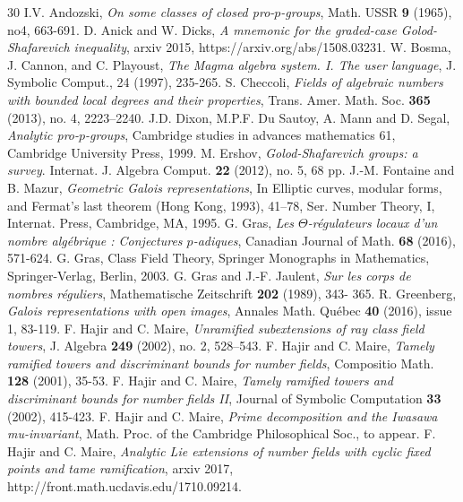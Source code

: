 \documentclass[12pt,a4paper,twoside,english]{smfart}
\begin{document}
\begin{thebibliography}{30}
I.V. Andozski, {\em On some classes of closed pro-$p$-groups}, Math. USSR {\bf 9} (1965), no4, 663-691.  
 D. Anick and W. Dicks, {\em A mnemonic for the graded-case Golod-Shafarevich inequality}, arxiv 2015,
https://arxiv.org/abs/1508.03231.
 W. Bosma, J. Cannon, and C. Playoust, {\em The Magma algebra system. I. The user language}, J. Symbolic Comput., 24 (1997), 235-265.
S. Checcoli, {\em Fields of algebraic numbers with bounded local degrees and their properties},  Trans. Amer. Math. Soc. {\bf 365} (2013), no. 4, 2223–2240.
 J.D. Dixon, M.P.F. Du Sautoy, A. Mann and D. Segal, {\em Analytic pro-$p$-groups}, Cambridge studies in advances mathematics 61, Cambridge University Press, 1999.
M. Ershov, {\em Golod-Shafarevich groups: a survey}. Internat. J. Algebra Comput. {\bf 22} (2012), no. 5, 68 pp.
 J.-M. Fontaine and B. Mazur, {\em Geometric Galois representations},
In Elliptic curves, modular forms, and Fermat's last theorem 
(Hong Kong, 1993), 41--78, Ser. Number Theory, I, Internat. Press, 
Cambridge, MA, 1995.
 G. Gras, {\em Les $\Theta$-r\'egulateurs locaux d'un nombre alg\'ebrique : Conjectures $p$-adiques}, Canadian Journal of Math. {\bf 68} (2016), 571-624.
G. Gras, Class Field Theory, Springer Monographs in Mathematics, Springer-Verlag, Berlin, 2003.
 G. Gras and J.-F. Jaulent,
{\em Sur les corps de nombres réguliers}, Mathematische Zeitschrift {\bf 202} (1989), 343-
365.
 R. Greenberg,  {\em Galois representations with open images}, Annales Math. Qu\'ebec {\bf 40} (2016), issue 1, 83-119.
F. Hajir and C. Maire, {\em Unramified subextensions of ray class field towers},  J. Algebra {\bf 249} (2002), no. 2,
 528–543.
 F. Hajir and C. Maire, {\em Tamely ramified towers and discriminant bounds for number fields}, Compositio Math. {\bf 128} (2001), 35-53.
  F. Hajir and C. Maire, {\em Tamely ramified towers and discriminant bounds for number fields II}, Journal of Symbolic Computation {\bf 33} (2002), 415-423.
 F. Hajir and C. Maire, {\em Prime decomposition and the Iwasawa mu-invariant}, Math. Proc. of the Cambridge Philosophical Soc., to appear. 
 F. Hajir and C. Maire, {\em  Analytic Lie extensions of number fields with cyclic fixed points and tame ramification}, arxiv 2017, http://front.math.ucdavis.edu/1710.09214.

\end{thebibliography}
\end{document}

